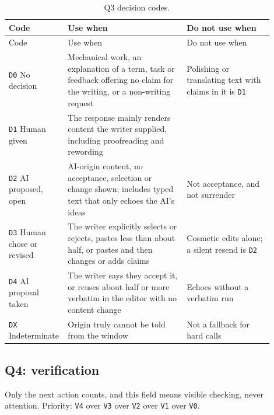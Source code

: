 \documentclass[manuscript,screen]{acmart}
\newcommand{\code}[1]{\texttt{#1}}
\begin{document}
\begin{longtable}{p{0.14\linewidth}p{0.44\linewidth}p{0.32\linewidth}}
\caption{Q3 decision codes.}\\
\toprule
Code & Use when & Do not use when \\
\midrule
\endfirsthead
\toprule
Code & Use when & Do not use when \\
\midrule
\endhead
\code{D0} No decision & Mechanical work, an explanation of a term, task or feedback offering no claim for the writing, or a non-writing request & Polishing or translating text with claims in it is \code{D1} \\
\code{D1} Human given & The response mainly renders content the writer supplied, including proofreading and rewording & \\
\code{D2} AI proposed, open & AI-origin content, no acceptance, selection or change shown; includes typed text that only echoes the AI's ideas & Not acceptance, and not surrender \\
\code{D3} Human chose or revised & The writer explicitly selects or rejects, pastes less than about half, or pastes and then changes or adds claims & Cosmetic edits alone; a silent resend is \code{D2} \\
\code{D4} AI proposal taken & The writer says they accept it, or reuses about half or more verbatim in the editor with no content change & Echoes without a verbatim run \\
\code{DX} Indeterminate & Origin truly cannot be told from the window & Not a fallback for hard calls \\
\bottomrule
\end{longtable}

\subsection{Q4: verification}

Only the next action counts, and this field means visible checking, never attention. Priority: \code{V4} over \code{V3} over \code{V2} over \code{V1} over \code{V0}.
\end{document}
